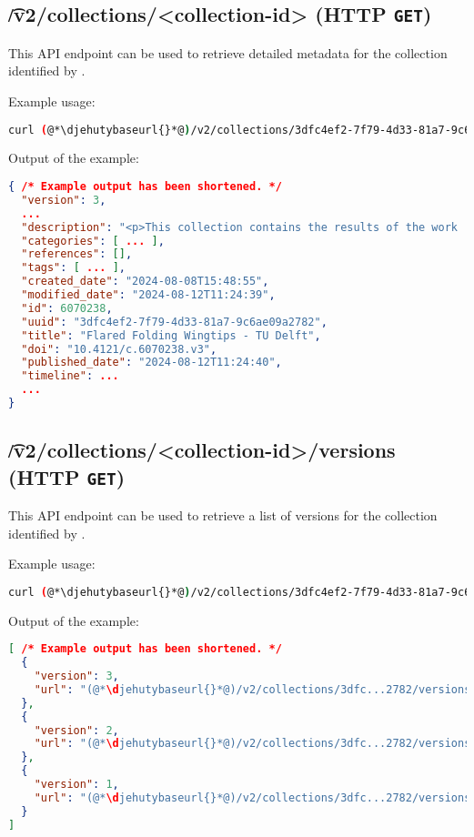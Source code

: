 \subsection{\t{/v2/collections/<collection-id>} (HTTP \texttt{GET})}

  This API endpoint can be used to retrieve detailed metadata for the collection
  identified by .

  Example usage:
\begin{lstlisting}[language=bash]
curl (@*\djehutybaseurl{}*@)/v2/collections/3dfc4ef2-7f79-4d33-81a7-9c6ae09a2782 | jq
\end{lstlisting}

  Output of the example:
\begin{lstlisting}[language=JSON]
{ /* Example output has been shortened. */
  "version": 3,
  ...
  "description": "<p>This collection contains the results of the work ...",
  "categories": [ ... ],
  "references": [],
  "tags": [ ... ],
  "created_date": "2024-08-08T15:48:55",
  "modified_date": "2024-08-12T11:24:39",
  "id": 6070238,
  "uuid": "3dfc4ef2-7f79-4d33-81a7-9c6ae09a2782",
  "title": "Flared Folding Wingtips - TU Delft",
  "doi": "10.4121/c.6070238.v3",
  "published_date": "2024-08-12T11:24:40",
  "timeline": ...
  ...
}
\end{lstlisting}

\subsection{\t{/v2/collections/<collection-id>/versions} (HTTP \texttt{GET})}

  This API endpoint can be used to retrieve a list of versions for the collection
  identified by .

  Example usage:
\begin{lstlisting}[language=bash]
curl (@*\djehutybaseurl{}*@)/v2/collections/3dfc4ef2-7f79-4d33-81a7-9c6ae09a2782/versions | jq
\end{lstlisting}

  Output of the example:
\begin{lstlisting}[language=JSON]
[ /* Example output has been shortened. */
  {
    "version": 3,
    "url": "(@*\djehutybaseurl{}*@)/v2/collections/3dfc...2782/versions/3"
  },
  {
    "version": 2,
    "url": "(@*\djehutybaseurl{}*@)/v2/collections/3dfc...2782/versions/2"
  },
  {
    "version": 1,
    "url": "(@*\djehutybaseurl{}*@)/v2/collections/3dfc...2782/versions/1"
  }
]
\end{lstlisting}

